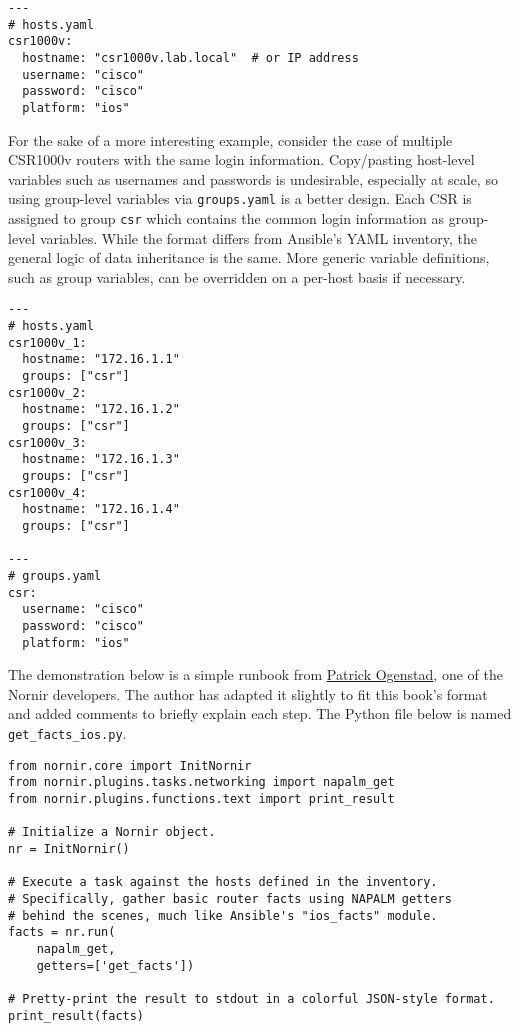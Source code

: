 \begin{verbatim}
---
# hosts.yaml
csr1000v:
  hostname: "csr1000v.lab.local"  # or IP address
  username: "cisco"
  password: "cisco"
  platform: "ios"
\end{verbatim}

For the sake of a more interesting example, consider the case of multiple
CSR1000v routers with the same login information. Copy/pasting host-level
variables such as usernames and passwords is undesirable, especially at scale,
so using group-level variables via \verb|groups.yaml| is a better design. Each
CSR is assigned to group \verb|csr| which contains the common login
information as group-level variables. While the format differs from Ansible's
YAML inventory, the general logic of data inheritance is the same. More
generic variable definitions, such as group variables, can be overridden on a
per-host basis if necessary.

\begin{verbatim}
---
# hosts.yaml
csr1000v_1:
  hostname: "172.16.1.1"
  groups: ["csr"]
csr1000v_2:
  hostname: "172.16.1.2"
  groups: ["csr"]
csr1000v_3:
  hostname: "172.16.1.3"
  groups: ["csr"]
csr1000v_4:
  hostname: "172.16.1.4"
  groups: ["csr"]

---
# groups.yaml
csr:
  username: "cisco"
  password: "cisco"
  platform: "ios"
\end{verbatim}

The demonstration below is a simple runbook from
\href{https://twitter.com/networklore}{Patrick Ogenstad}, one of the Nornir
developers. The author has adapted it slightly to fit this book's format and
added comments to briefly explain each step. The Python file below is
named \verb|get_facts_ios.py|.

\begin{verbatim}
from nornir.core import InitNornir
from nornir.plugins.tasks.networking import napalm_get
from nornir.plugins.functions.text import print_result

# Initialize a Nornir object.
nr = InitNornir()

# Execute a task against the hosts defined in the inventory.
# Specifically, gather basic router facts using NAPALM getters
# behind the scenes, much like Ansible's "ios_facts" module.
facts = nr.run(
    napalm_get,
    getters=['get_facts'])

# Pretty-print the result to stdout in a colorful JSON-style format.
print_result(facts)
\end{verbatim}

